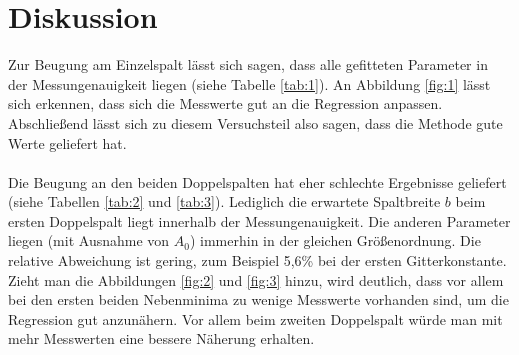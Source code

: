 \section{Diskussion}
Zur Beugung am Einzelspalt lässt sich sagen, dass alle gefitteten Parameter in der
Messungenauigkeit liegen (siehe Tabelle \ref{tab:1}). An Abbildung \ref{fig:1} lässt sich erkennen, dass sich die Messwerte
gut an die Regression anpassen. Abschließend lässt sich zu diesem Versuchsteil also sagen, dass
die Methode gute Werte geliefert hat. \\
\\
Die Beugung an den beiden Doppelspalten hat eher schlechte Ergebnisse geliefert (siehe Tabellen \ref{tab:2} und \ref{tab:3}).
Lediglich die erwartete Spaltbreite $b$ beim ersten Doppelspalt liegt innerhalb der Messungenauigkeit.
Die anderen Parameter liegen (mit Ausnahme von $A_0$) immerhin in der gleichen Größenordnung. Die relative Abweichung
ist gering, zum Beispiel 5,6\% bei der ersten Gitterkonstante. Zieht man die Abbildungen \ref{fig:2} und \ref{fig:3}
hinzu, wird deutlich, dass vor allem bei den ersten beiden Nebenminima zu wenige Messwerte vorhanden sind,
um die Regression gut anzunähern. Vor allem beim zweiten Doppelspalt würde man mit mehr Messwerten
eine bessere Näherung erhalten.
\newpage
\nocite{*}
\printbibliography
